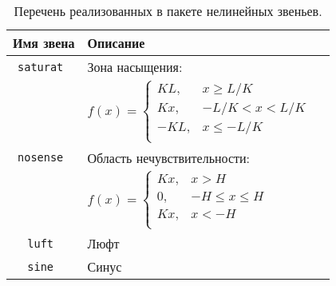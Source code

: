 \begin{table}[ht]
  \centering
  \caption{Перечень реализованных в пакете нелинейных звеньев.}
  \label{tabl:nonlinear_functions}
  \begin{tabular}{|c|l|l|}
    \hline
    Имя звена & Описание \\
    \hline
    \tt saturat & Зона насыщения: \\
    & $f(x)=\left\{
      \begin{array}{rl}
        KL,  & x \ge L/K \\
        Kx,  & -L/K < x < L/K \\
        -KL,  & x \le -L/K \\
      \end{array}\right.$ \\
    \hline
    \tt nosense & Область нечувствительности: \\
    & $f(x)=\left\{
      \begin{array}{rl}
        Kx,  & x > H \\
        0,   & -H \le x \le H \\
        Kx, & x < -H \\
      \end{array}\right.$ \\
    \hline
    \tt luft & Люфт \\
    \hline
    \tt sine & Синус \\
    \hline
  \end{tabular}
\end{table}

